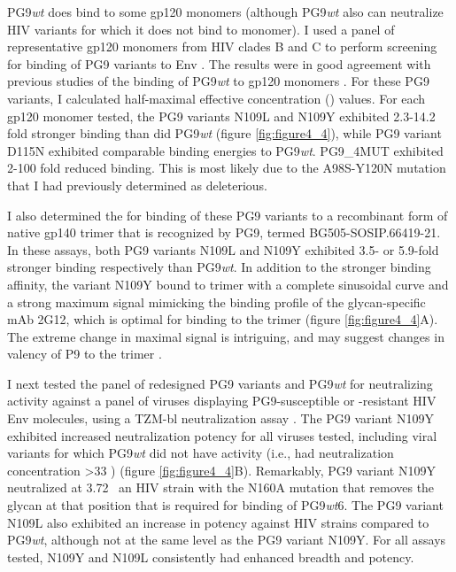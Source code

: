 PG9\textit{wt} does bind to some gp120 monomers (although PG9\textit{wt} also can neutralize HIV variants for which it does not bind to monomer). I used a panel of representative gp120 monomers from HIV clades B and C to perform screening for binding of PG9 variants to Env \citep{Li:2006kv,Li:2005go}. The results were in good agreement with previous studies of the binding of PG9\textit{wt} to gp120 monomers \citep{McLellan:2011dg}. For these PG9 variants, I calculated half-maximal effective concentration (\ec) values. For each gp120 monomer tested, the PG9 variants N109L and N109Y exhibited 2.3-14.2 fold stronger binding than did PG9\textit{wt} (figure \ref{fig:figure4_4}), while PG9 variant D115N exhibited comparable binding energies to PG9\textit{wt}. PG9\_4MUT exhibited 2-100 fold reduced binding. This is most likely due to the A98S-Y120N mutation that I had previously determined as deleterious.

I also determined the \ec for binding of these PG9 variants to a recombinant form of native gp140 trimer that is recognized by PG9, termed BG505-SOSIP.66419-21. In these assays, both PG9 variants N109L and N109Y exhibited 3.5- or 5.9-fold stronger binding respectively than PG9\textit{wt}. In addition to the stronger binding affinity, the variant N109Y bound to trimer with a complete sinusoidal curve and a strong maximum signal mimicking the binding profile of the glycan-specific mAb 2G12, which is optimal for binding to the trimer \citep{Sanders:2013gm}  (figure \ref{fig:figure4_4}A). The extreme change in maximal signal is intriguing, and may suggest changes in valency of P9 to the trimer \citep{Julien:2013jp}.

I next tested the panel of redesigned PG9 variants and PG9\textit{wt} for neutralizing activity against a panel of viruses displaying PG9-susceptible or -resistant HIV Env molecules, using a TZM-bl neutralization assay \citep{Montefiori:2009hj}. The PG9 variant N109Y exhibited increased neutralization potency for all viruses tested, including viral variants for which PG9\textit{wt} did not have activity (i.e., had neutralization concentration >33 \mcml) (figure \ref{fig:figure4_4}B). Remarkably, PG9 variant N109Y neutralized at 3.72 \mcml~an HIV strain with the N160A mutation that removes the glycan at that position that is required for binding of PG9\textit{wt}6. The PG9 variant N109L also exhibited an increase in potency against HIV strains compared to PG9\textit{wt}, although not at the same level as the PG9 variant N109Y. For all assays tested, N109Y and N109L consistently had enhanced breadth and potency.


